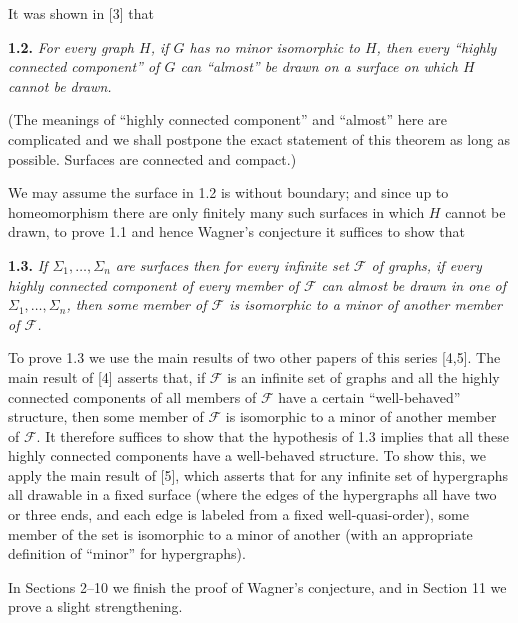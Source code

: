 It was shown in [3] that

\textbf{1.2.} \textit{For every graph $H$, if $G$ has no minor isomorphic to $H$, then every ``highly connected component'' of $G$ can ``almost'' be drawn on a surface on which $H$ cannot be drawn.}

(The meanings of ``highly connected component'' and ``almost'' here are complicated and we shall postpone the exact statement of this theorem as long as possible. Surfaces are connected and compact.)

We may assume the surface in 1.2 is without boundary; and since up to homeomorphism there are only finitely many such surfaces in which $H$ cannot be drawn, to prove 1.1 and hence Wagner's conjecture it suffices to show that

\textbf{1.3.} \textit{If $\Sigma_1, \ldots, \Sigma_n$ are surfaces then for every infinite set $\mathcal{F}$ of graphs, if every highly connected component of every member of $\mathcal{F}$ can almost be drawn in one of $\Sigma_1, \ldots, \Sigma_n$, then some member of $\mathcal{F}$ is isomorphic to a minor of another member of $\mathcal{F}$.}

To prove 1.3 we use the main results of two other papers of this series [4,5]. The main result of [4] asserts that, if $\mathcal{F}$ is an infinite set of graphs and all the highly connected components of all members of $\mathcal{F}$ have a certain ``well-behaved'' structure, then some member of $\mathcal{F}$ is isomorphic to a minor of another member of $\mathcal{F}$. It therefore suffices to show that the hypothesis of 1.3 implies that all these highly connected components have a well-behaved structure. To show this, we apply the main result of [5], which asserts that for any infinite set of hypergraphs all drawable in a fixed surface (where the edges of the hypergraphs all have two or three ends, and each edge is labeled from a fixed well-quasi-order), some member of the set is isomorphic to a minor of another (with an appropriate definition of ``minor'' for hypergraphs).

In Sections 2--10 we finish the proof of Wagner's conjecture, and in Section 11 we prove a slight strengthening.


